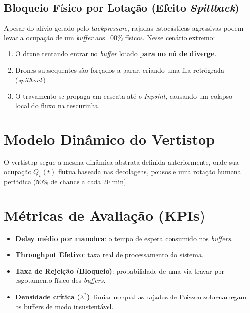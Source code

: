 \documentclass[12pt,a4paper]{article}
\begin{document}
\subsection{Bloqueio Físico por Lotação (Efeito \textit{Spillback})}

Apesar do alívio gerado pelo \textit{backpressure}, rajadas estocásticas agressivas podem levar a ocupação de um \textit{buffer} aos $100\%$ físicos. Nesse cenário extremo:

\begin{enumerate}
    \item O drone tentando entrar no \textit{buffer} lotado \textbf{para no nó de diverge}.
    \item Drones subsequentes são forçados a parar, criando uma fila retrógrada (\textit{spillback}).
    \item O travamento se propaga em cascata até o \textit{Inpoint}, causando um colapso local do fluxo na tesourinha.
\end{enumerate}

\section{Modelo Dinâmico do Vertistop}
\label{sec:vertistop_dinamico}
O vertistop segue a mesma dinâmica abstrata definida anteriormente, onde sua ocupação $Q_v(t)$ flutua baseada nas decolagens, pousos e uma rotação humana periódica (50\% de chance a cada 20 min).

\section{Métricas de Avaliação (KPIs)}
\label{sec:kpis}

\begin{itemize}
    \item \textbf{Delay médio por manobra}: o tempo de espera consumido nos \textit{buffers}.
    \item \textbf{Throughput Efetivo}: taxa real de processamento do sistema.
    \item \textbf{Taxa de Rejeição (Bloqueio)}: probabilidade de uma via travar por esgotamento físico dos \textit{buffers}.
    \item \textbf{Densidade crítica ($\lambda^*$)}: limiar no qual as rajadas de Poisson sobrecarregam os buffers de modo insustentável.
\end{itemize}
\end{document}
